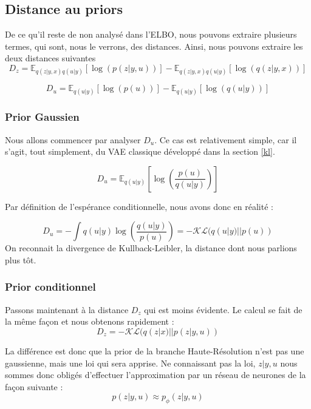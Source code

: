 \documentclass{article}
\begin{document}
\subsection{Distance au priors}

De ce qu'il reste de non analysé dans l'ELBO, nous pouvons extraire plusieurs termes, qui sont, nous le verrons, des distances.
Ainsi, nous pouvons extraire les deux distances suivantes 
\begin{equation*}
 D_z = \mathbb{E}_{q(z|y,x)q(u|y)}\left[\log(p(z|y,u))\right]- \mathbb{E}_{q(z|y,x)q(u|y)}\left[\log(q(z|y,x))\right]
\end{equation*}
    
\begin{equation*}
 D_u = \mathbb{E}_{q(u|y)}\left[\log(p(u))\right] - \mathbb{E}_{q(u|y)}\left[\log(q(u|y))\right]
\end{equation*}

\subsubsection{Prior Gaussien}
Nous allons commencer par analyser $D_u$. Ce cas est relativement simple, car il s'agit, tout simplement, du VAE classique développé dans la section \ref{kl}.

\begin{equation*}
 D_u = \mathbb{E}_{q(u|y)}\left[\log\left(\frac{p(u)}{q(u|y)}\right)\right]
\end{equation*}

Par définition de l'espérance conditionnelle, nous avons donc en réalité :

\begin{equation*}
    D_u = - \int q(u|y) \log\left(\frac{q(u|y)}{p(u)}\right) = - \mathcal{KL}(q(u|y)||p(u)) 
\end{equation*}
On reconnait la divergence de Kullback-Leibler, la distance dont nous parlions plus tôt.

\subsubsection{Prior conditionnel}
Passons maintenant à la distance $D_z$ qui est moins évidente.
Le calcul se fait de la même façon et nous obtenons rapidement :
\begin{equation}
    D_z = - \mathcal{KL}(q(z|x)||p(z|y,u))
\end{equation}

La différence est donc que la prior de la branche Haute-Résolution n'est pas une gaussienne, mais une loi qui sera apprise.
Ne connaissant pas la loi, $z|y,u$ nous sommes donc obligés d'effectuer l'approximation par un réseau de neurones de la façon suivante :
\begin{equation*}
    p(z|y,u) \approx p_\phi(z|y,u)
\end{equation*}
\end{document}
